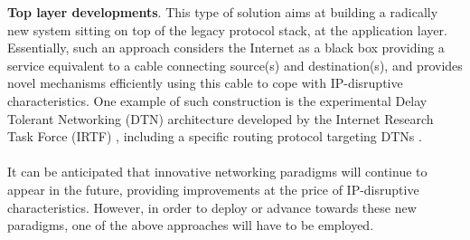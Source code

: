 %
{\bf Top layer developments}. This type of solution aims at building a radically new system sitting on top of the legacy protocol stack, at the application layer. Essentially, such an approach considers the Internet as a black box providing a service equivalent to a cable connecting source(s) and destination(s), and provides novel mechanisms efficiently using this cable to cope with IP-disruptive characteristics. One example of such construction is the experimental Delay Tolerant Networking (DTN) architecture developed by the Internet Research Task Force (IRTF) \cite{DTNRG} \cite{rfc5050} \cite{rfc5326}, including a specific routing protocol targeting DTNs \cite{rfc6693}.\ \\ \ \\
%
%
It can be anticipated that innovative networking paradigms will continue to appear in the future, providing improvements at the price of IP-disruptive characteristics. However, in order to deploy or advance towards these new paradigms, one of the above approaches will have to be employed.






